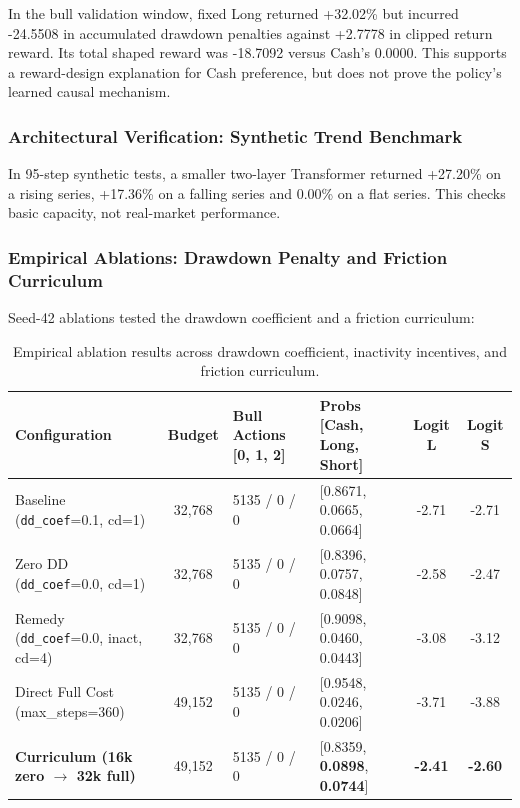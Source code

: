 \documentclass[11pt,a4paper]{article}
\begin{document}
In the bull validation window, fixed Long returned +32.02\% but incurred -24.5508 in accumulated drawdown penalties against +2.7778 in clipped return reward. Its total shaped reward was -18.7092 versus Cash's 0.0000. This supports a reward-design explanation for Cash preference, but does not prove the policy's learned causal mechanism.

\subsubsection{Architectural Verification: Synthetic Trend Benchmark}
In 95-step synthetic tests, a smaller two-layer Transformer returned +27.20\% on a rising series, +17.36\% on a falling series and 0.00\% on a flat series. This checks basic capacity, not real-market performance.

\subsubsection{Empirical Ablations: Drawdown Penalty and Friction Curriculum}
Seed-42 ablations tested the drawdown coefficient and a friction curriculum:

\begin{table}[H]
\centering
\footnotesize
\begin{tabularx}{\textwidth}{p{3.5cm} c p{2.8cm} p{2.8cm} c c}
\toprule
\textbf{Configuration} & \textbf{Budget} & \textbf{Bull Actions [0, 1, 2]} & \textbf{Probs [Cash, Long, Short]} & \textbf{Logit L} & \textbf{Logit S} \\
\midrule
Baseline (\texttt{dd\_coef}=0.1, cd=1) & 32,768 & 5135 / 0 / 0 & [0.8671, 0.0665, 0.0664] & -2.71 & -2.71 \\
Zero DD (\texttt{dd\_coef}=0.0, cd=1) & 32,768 & 5135 / 0 / 0 & [0.8396, 0.0757, 0.0848] & -2.58 & -2.47 \\
Remedy (\texttt{dd\_coef}=0.0, inact, cd=4) & 32,768 & 5135 / 0 / 0 & [0.9098, 0.0460, 0.0443] & -3.08 & -3.12 \\
Direct Full Cost (max\_steps=360) & 49,152 & 5135 / 0 / 0 & [0.9548, 0.0246, 0.0206] & -3.71 & -3.88 \\
\textbf{Curriculum (16k zero $\to$ 32k full)} & 49,152 & 5135 / 0 / 0 & [0.8359, \textbf{0.0898}, \textbf{0.0744}] & \textbf{-2.41} & \textbf{-2.60} \\
\bottomrule
\end{tabularx}
\caption{Empirical ablation results across drawdown coefficient, inactivity incentives, and friction curriculum.}
\label{tab:ablation_results}
\end{table}
\end{document}
